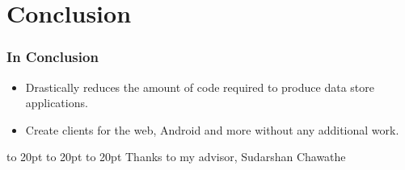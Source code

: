 \documentclass[]{beamer}
\newcommand{\pad}{\vbox to 20pt{}}
\begin{document}
%
%
%
%
%
%




%
%
%


\section{Conclusion}

\begin{frame}
\frametitle{In Conclusion}

\begin{itemize}
  \item Drastically reduces the amount of code required to produce data store
    applications.
  \item Create clients for the web, Android and more without any additional
    work.
\end{itemize}

\pad
\pad
\pad
Thanks to my advisor, Sudarshan Chawathe

\end{frame}
\end{document}
